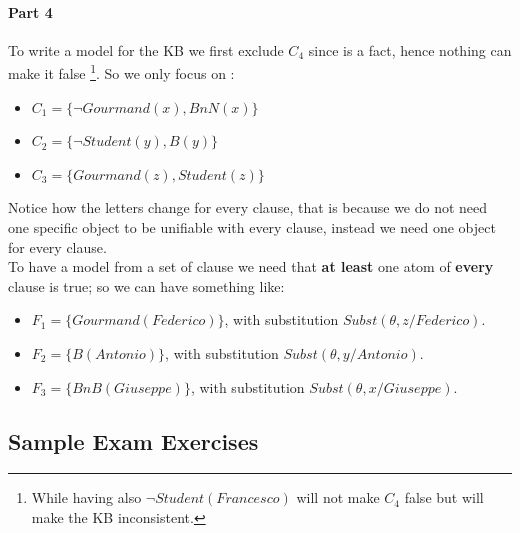 \documentclass[10pt,a4paper]{article}
\newcommand{\braces}[1]{%
  \lbrace{#1}\rbrace}
\newcommand{\subst}[1]{Subst(\theta,#1)}
\begin{document}
\paragraph{Part 4}
To write a model for the KB we first exclude $C_4$ since is a fact, hence nothing can make it false \footnote{While having also $\neg Student(Francesco)$ will not make $C_4$ false but will make the KB inconsistent.}. So we only focus on :
\begin{itemize}
\item $C_1=\braces{\neg Gourmand(x), BnN(x)}$
\item $C_2=\braces{\neg Student(y), B(y)}$
\item $C_3=\braces{Gourmand(z), Student(z)}$
\end{itemize}
Notice how the letters change for every clause, that is because we do not need one specific object to be unifiable with every clause, instead we need one object for every clause.\\
To have a model from a set of clause we need that \textbf{at least} one atom of \textbf{every} clause is true; so we can have something like:
\begin{itemize}
\item $F_1=\braces{Gourmand(Federico)}$, with substitution $\subst{z/Federico}$.
\item $F_2=\braces{B(Antonio)}$, with substitution $\subst{y/Antonio}$.
\item $F_3=\braces{BnB(Giuseppe)}$, with substitution $\subst{x/Giuseppe}$.
\end{itemize}





\vfill

\subsection{Sample Exam Exercises}
\end{document}
